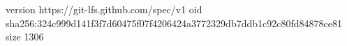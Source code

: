 version https://git-lfs.github.com/spec/v1
oid sha256:324c999d141f3f7d60475f07f4206424a3772329db7ddb1c92c80fd84878ce81
size 1306
